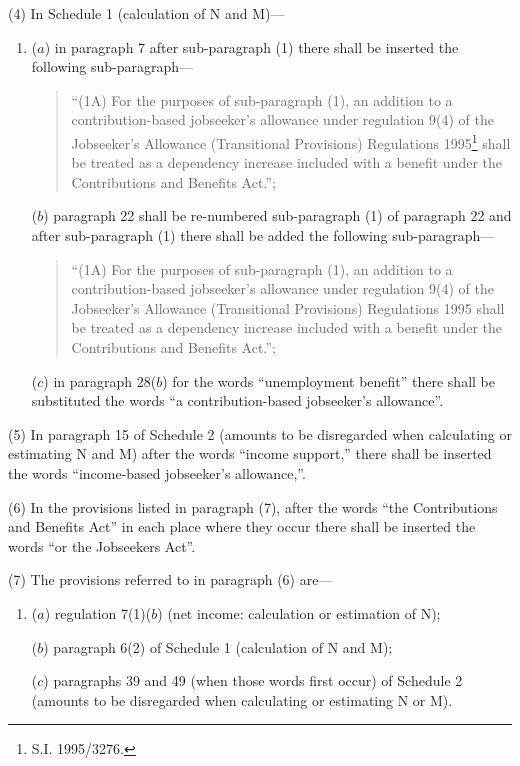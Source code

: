 \documentclass[a4paper]{article}
\begin{document}
(4) In Schedule 1 (calculation of N and M)—
\begin{enumerate}\item[]
($a$) in paragraph 7 after sub-paragraph (1) there shall be inserted the following sub-paragraph—
\begin{quotation}
“(1A) For the purposes of sub-paragraph (1), an addition to a contribution-based jobseeker’s allowance under regulation 9(4) of the Jobseeker’s Allowance (Transitional Provisions) Regulations 1995\footnote{\frenchspacing S.I. 1995/3276.} shall be treated as a dependency increase included with a benefit under the Contributions and Benefits Act.”;
\end{quotation}

($b$) paragraph 22 shall be re-numbered sub-paragraph (1) of paragraph 22 and after sub-paragraph (1) there shall be added the following sub-paragraph—
\begin{quotation}
“(1A) For the purposes of sub-paragraph (1), an addition to a contribution-based jobseeker’s allowance under regulation 9(4) of the Jobseeker’s Allowance (Transitional Provisions) Regulations 1995 shall be treated as a dependency increase included with a benefit under the Contributions and Benefits Act.”;
\end{quotation}

($c$) in paragraph 28($b$) for the words “unemployment benefit” there shall be substituted the words “a contribution-based jobseeker’s allowance”.
\end{enumerate}

(5) In paragraph 15 of Schedule 2 (amounts to be disregarded when calculating or estimating N and M) after the words “income support,” there shall be inserted the words “income-based jobseeker’s allowance,”.

(6) In the provisions listed in paragraph (7), after the words “the Contributions and Benefits Act” in each place where they occur there shall be inserted the words “or the Jobseekers Act”.

(7) The provisions referred to in paragraph (6) are—
\begin{enumerate}\item[]
($a$) regulation 7(1)($b$) (net income: calculation or estimation of N);

($b$) paragraph 6(2) of Schedule 1 (calculation of N and M);

($c$) paragraphs 39 and 49 (when those words first occur) of Schedule 2 (amounts to be disregarded when calculating or estimating N or M).
\end{enumerate}
\end{document}

